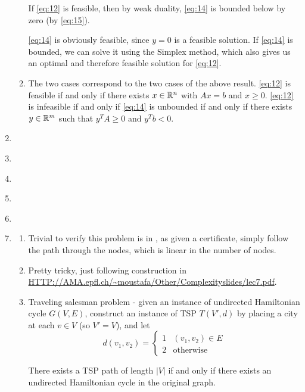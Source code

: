 \begin{enumerate}
\begin{enumerate}
    If \eqref{eq:12} is feasible, then by weak duality, \eqref{eq:14}
    is bounded below by zero (by \eqref{eq:15}).

    \eqref{eq:14} is obviously feasible, since $y = 0$ is a feasible
    solution.  If \eqref{eq:14} is bounded, we can solve it using the
    Simplex method, which also gives us an optimal and therefore
    feasible solution for \eqref{eq:12}.
  \item The two cases correspond to the two cases of the above result.
    \eqref{eq:12} is feasible if and only if there exists $x \in
    \mathbb{R}^{n}$ with $Ax = b$ and $x \geq 0$. \eqref{eq:12} is infeasible
    if and only if \eqref{eq:14} is unbounded if and only if there
    exists $y \in \mathbb{R}^{m}$ such that $y^{T}A \geq 0$ and $y^{T}b < 0$.
  \end{enumerate}
\item \label{item:6}
  
  
\item \label{item:7}
  
\item \label{item:8}

\item \label{item:9}
  
\item \label{item:10}
\item \label{item:11}
  \begin{enumerate}
  \item
    Trivial to verify this problem is in \np, as given a certificate,
    simply follow the path through the nodes, which is linear in the
    number of nodes.
  \item
    Pretty tricky, just following construction in
    \url{HTTP://AMA.epfl.ch/~moustafa/Other/Complexityslides/lec7.pdf}.
  \item
    Traveling salesman problem - given an instance of undirected
    Hamiltonian cycle $G(V, E)$, construct an instance of TSP $T(V', d)$ by
    placing a city at each $v \in V$ (so $V' = V$), and let
    \begin{equation}
      \label{eq:1}
      d(v_{1}, v_{2}) =
      \begin{cases}
        1 & (v_{1}, v_{2}) \in E \\
        2 & \text{otherwise}
      \end{cases}
    \end{equation}

    There exists a TSP path of length $|V|$ if and only if there exists an
    undirected Hamiltonian cycle in the original graph.


\end{enumerate}
\end{enumerate}
